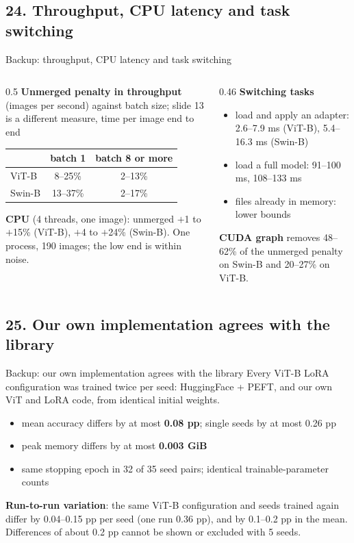 \documentclass[aspectratio=169,11pt]{beamer}
\begin{document}
\subsection{24. Throughput, CPU latency and task switching}
\begin{frame}{Backup: throughput, CPU latency and task switching}
\small
\begin{columns}[T]
\begin{column}{0.5\textwidth}
\textbf{Unmerged penalty in throughput} (images per second) against batch size; slide 13 is a different measure, time per image end to end\par\smallskip
\begin{tabular}{@{}lcc@{}}
\toprule
 & batch 1 & batch 8 or more \\
\midrule
ViT-B & 8--25\% & 2--13\% \\
Swin-B & 13--37\% & 2--17\% \\
\bottomrule
\end{tabular}
\par\medskip
\textbf{CPU} (4 threads, one image): unmerged $+$1 to $+$15\% (ViT-B), $+$4 to $+$24\% (Swin-B). One process, 190 images; the low end is within noise.
\end{column}
\begin{column}{0.46\textwidth}
\textbf{Switching tasks}
\begin{itemize}
  \item load and apply an adapter: 2.6--7.9 ms (ViT-B), 5.4--16.3 ms (Swin-B)
  \item load a full model: 91--100 ms, 108--133 ms
  \item files already in memory: lower bounds
\end{itemize}
\medskip
\textbf{CUDA graph} removes 48--62\% of the unmerged penalty on Swin-B and 20--27\% on ViT-B.
\end{column}
\end{columns}
\end{frame}

\subsection{25. Our own implementation agrees with the library}
\begin{frame}{Backup: our own implementation agrees with the library}
\small
Every ViT-B LoRA configuration was trained twice per seed: HuggingFace + PEFT, and our own ViT and LoRA code, from identical initial weights.
\begin{itemize}
  \item mean accuracy differs by at most \textbf{0.08 pp}; single seeds by at most 0.26 pp
  \item peak memory differs by at most \textbf{0.003 GiB}
  \item same stopping epoch in 32 of 35 seed pairs; identical trainable-parameter counts
\end{itemize}
\medskip
\textbf{Run-to-run variation}: the same ViT-B configuration and seeds trained again differ by 0.04--0.15 pp per seed (one run 0.36 pp), and by 0.1--0.2 pp in the mean. Differences of about 0.2 pp cannot be shown or excluded with 5 seeds.
\end{frame}
\end{document}

